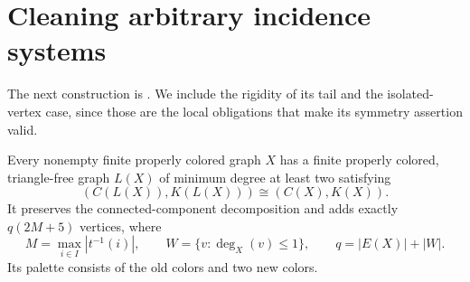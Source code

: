 \section{Cleaning arbitrary incidence systems}
\label{sec:cleaning}
The next construction is \cite[Theorem 4.2]{DMV}. We include the rigidity of
its tail and the isolated-vertex case, since those are the local obligations
that make its symmetry assertion valid.

\begin{theorem}[Cleaning]\label{UR.Cleaning}
Every nonempty finite properly colored graph $X$ has a finite properly colored,
triangle-free graph $L(X)$ of minimum degree at least two satisfying
\[
 (C(L(X)),K(L(X)))\cong(C(X),K(X)).
\]
It preserves the connected-component decomposition and adds exactly
$q(2M+5)$ vertices, where
\[
 M=\max_{i\in I}|t^{-1}(i)|,
 \qquad W=\{v:\deg_X(v)\leq1\},\qquad q=|E(X)|+|W|.
\]
Its palette consists of the old colors and two new colors.
\end{theorem}
